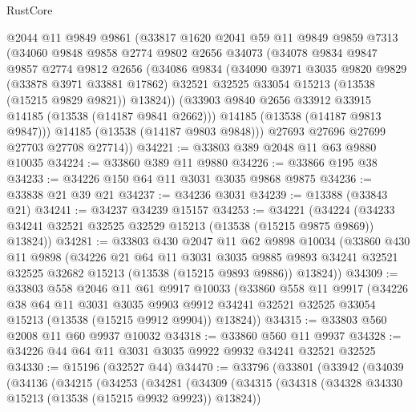 \begin{lexlean}{RustCore}
\begin{coremodule}
      @2044
      @11
      @9849
      @9861
      (@33817
        @1620
        @2041
        @59
        @11
        @9849
        @9859
        @7313
        (@34060
          @9848
          @9858
          @2774
          @9802
          @2656
          @34073
          (@34078
            @9834
            @9847
            @9857
            @2774
            @9812
            @2656
            (@34086
              @9834
              (@34090
                @3971
                @3035
                @9820
                @9829
                (@33878 @3971 @33881 @17862)
                @32521
                @32525
                @33054
                @15213
                (@13538 (@15215 @9829 @9821))
                @13824))
            (@33903 @9840 @2656 @33912 @33915 @14185 (@13538 (@14187 @9841 @2662)))
            @14185
            (@13538 (@14187 @9813 @9847)))
          @14185
          (@13538 (@14187 @9803 @9848)))
        @27693
        @27696
        @27699
        @27703
        @27708
        @27714))
@34221 := @33803 @389 @2048 @11 @63 @9880 @10035
@34224 := @33860 @389 @11 @9880
@34226 := @33866 @195 @38
@34233 := @34226 @150 @64 @11 @3031 @3035 @9868 @9875
@34236 := @33838 @21 @39 @21
@34237 := @34236 @3031
@34239 := @13388 (@33843 @21)
@34241 := @34237 @34239 @15157
@34253 := @34221
    (@34224 (@34233 @34241 @32521 @32525 @32529 @15213 (@13538 (@15215 @9875 @9869)) @13824))
@34281 := @33803
    @430
    @2047
    @11
    @62
    @9898
    @10034
    (@33860
      @430
      @11
      @9898
      (@34226
        @21
        @64
        @11
        @3031
        @3035
        @9885
        @9893
        @34241
        @32521
        @32525
        @32682
        @15213
        (@13538 (@15215 @9893 @9886))
        @13824))
@34309 := @33803
    @558
    @2046
    @11
    @61
    @9917
    @10033
    (@33860
      @558
      @11
      @9917
      (@34226
        @38
        @64
        @11
        @3031
        @3035
        @9903
        @9912
        @34241
        @32521
        @32525
        @33054
        @15213
        (@13538 (@15215 @9912 @9904))
        @13824))
@34315 := @33803 @560 @2008 @11 @60 @9937 @10032
@34318 := @33860 @560 @11 @9937
@34328 := @34226 @44 @64 @11 @3031 @3035 @9922 @9932 @34241 @32521 @32525
@34330 := @15196 (@32527 @44)
@34470 := @33796
    (@33801
      (@33942
        (@34039
          (@34136
            (@34215
              (@34253
                (@34281
                  (@34309
                    (@34315
                      (@34318 (@34328 @34330 @15213 (@13538 (@15215 @9932 @9923)) @13824))

\end{coremodule}
\end{lexlean}
